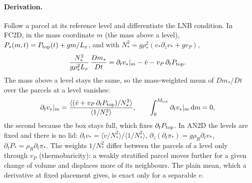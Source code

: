 \documentclass[11pt,a4paper]{article}
\newcommand{\Mtot}{M_{\rm tot}}
\newcommand{\Ptop}{P_{\rm top}}
\begin{document}
\paragraph{Derivation.} Follow a parcel at its reference level and differentiate the LNB condition. In FC2D, in the mass
coordinate $m$ (the mass above a level), $P_*(m,t)=\Ptop(t)+gm/L_x$, and with $N_*^2=g\rho_*^2(v_*\partial_zv_*+gv_P)$,
\begin{equation}
  \frac{N_*^2}{g\rho_*^2L_x}\,\frac{Dm_*}{Dt}=\partial_tv_*|_m-\dot v-v_P\,\partial_t\Ptop .
\end{equation}
The mass above a level stays the same, so the mass-weighted mean of $Dm_*/Dt$ over the parcels at a level vanishes:
\begin{equation}
  \partial_tv_*|_m=\frac{\langle(\dot v+v_P\,\partial_t\Ptop)/N_*^2\rangle}{\langle1/N_*^2\rangle},\qquad
  \int_0^{\Mtot}\partial_tv_*|_m\,\mathrm{d}m=0,
\end{equation}
the second because the box stays full, which fixes $\partial_t\Ptop$. In AN2D the levels are fixed and there is no lid:
$\partial_tv_*=\langle\dot v/N_*^2\rangle/\langle1/N_*^2\rangle$, $\partial_z(\partial_t\pi_*)=g\rho_R\partial_tv_*$,
$\partial_tP_*=\rho_R\partial_t\pi_*$. The weights $1/N_*^2$ differ between the parcels of a level only through $v_P$
(thermobaricity): a weakly stratified parcel moves further for a given change of volume and displaces more of its neighbours.
The plain mean, which a derivative at fixed placement gives, is exact only for a separable $v$.
\end{document}
